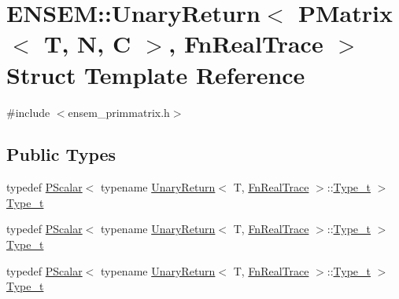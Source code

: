 \hypertarget{structENSEM_1_1UnaryReturn_3_01PMatrix_3_01T_00_01N_00_01C_01_4_00_01FnRealTrace_01_4}{}\section{E\+N\+S\+EM\+:\+:Unary\+Return$<$ P\+Matrix$<$ T, N, C $>$, Fn\+Real\+Trace $>$ Struct Template Reference}
\label{structENSEM_1_1UnaryReturn_3_01PMatrix_3_01T_00_01N_00_01C_01_4_00_01FnRealTrace_01_4}


{\ttfamily \#include $<$ensem\+\_\+primmatrix.\+h$>$}

\subsection*{Public Types}
\begin{DoxyCompactItemize}
\item 
typedef \mbox{\hyperlink{classENSEM_1_1PScalar}{P\+Scalar}}$<$ typename \mbox{\hyperlink{structENSEM_1_1UnaryReturn}{Unary\+Return}}$<$ T, \mbox{\hyperlink{structENSEM_1_1FnRealTrace}{Fn\+Real\+Trace}} $>$\+::\mbox{\hyperlink{structENSEM_1_1UnaryReturn_3_01PMatrix_3_01T_00_01N_00_01C_01_4_00_01FnRealTrace_01_4_a22a5a3f850fb258f3825c3a6f84a3259}{Type\+\_\+t}} $>$ \mbox{\hyperlink{structENSEM_1_1UnaryReturn_3_01PMatrix_3_01T_00_01N_00_01C_01_4_00_01FnRealTrace_01_4_a22a5a3f850fb258f3825c3a6f84a3259}{Type\+\_\+t}}
\item 
typedef \mbox{\hyperlink{classENSEM_1_1PScalar}{P\+Scalar}}$<$ typename \mbox{\hyperlink{structENSEM_1_1UnaryReturn}{Unary\+Return}}$<$ T, \mbox{\hyperlink{structENSEM_1_1FnRealTrace}{Fn\+Real\+Trace}} $>$\+::\mbox{\hyperlink{structENSEM_1_1UnaryReturn_3_01PMatrix_3_01T_00_01N_00_01C_01_4_00_01FnRealTrace_01_4_a22a5a3f850fb258f3825c3a6f84a3259}{Type\+\_\+t}} $>$ \mbox{\hyperlink{structENSEM_1_1UnaryReturn_3_01PMatrix_3_01T_00_01N_00_01C_01_4_00_01FnRealTrace_01_4_a22a5a3f850fb258f3825c3a6f84a3259}{Type\+\_\+t}}
\item 
typedef \mbox{\hyperlink{classENSEM_1_1PScalar}{P\+Scalar}}$<$ typename \mbox{\hyperlink{structENSEM_1_1UnaryReturn}{Unary\+Return}}$<$ T, \mbox{\hyperlink{structENSEM_1_1FnRealTrace}{Fn\+Real\+Trace}} $>$\+::\mbox{\hyperlink{structENSEM_1_1UnaryReturn_3_01PMatrix_3_01T_00_01N_00_01C_01_4_00_01FnRealTrace_01_4_a22a5a3f850fb258f3825c3a6f84a3259}{Type\+\_\+t}} $>$ \mbox{\hyperlink{structENSEM_1_1UnaryReturn_3_01PMatrix_3_01T_00_01N_00_01C_01_4_00_01FnRealTrace_01_4_a22a5a3f850fb258f3825c3a6f84a3259}{Type\+\_\+t}}
\end{DoxyCompactItemize}


